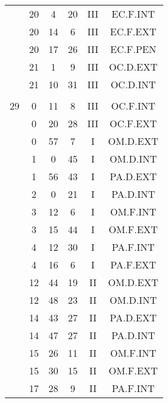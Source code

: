 \documentclass[12pt, a4paper]{article}
\begin{document}
\begin{multicols}{3}
{\begin{tabular}{c c c c c c}
	 	 	 	 & 20 & 4 & 20 & III & EC.F.INT\\%
	 	 	 	 & 20 & 14 & 6 & III & EC.F.EXT\\%
	 	 	 	 & 20 & 17 & 26 & III & EC.F.PEN\\%
	 	 	 	 & 21 & 1 & 9 & III & OC.D.EXT\\%
	 	 	 	 & 21 & 10 & 31 & III & OC.D.INT\\%
	 	 	 	 & & & & & \\%
	 	 	 	29 & 0 & 11 & 8 & III & OC.F.INT\\%
	 	 	 	 & 0 & 20 & 28 & III & OC.F.EXT\\%
	 	 	 	 & 0 & 57 & 7 & I & OM.D.EXT\\%
	 	 	 	 & 1 & 0 & 45 & I & OM.D.INT\\%
	 	 	 	 & 1 & 56 & 43 & I & PA.D.EXT\\%
	 	 	 	 & 2 & 0 & 21 & I & PA.D.INT\\%
	 	 	 	 & 3 & 12 & 6 & I & OM.F.INT\\%
	 	 	 	 & 3 & 15 & 44 & I & OM.F.EXT\\%
	 	 	 	 & 4 & 12 & 30 & I & PA.F.INT\\%
	 	 	 	 & 4 & 16 & 6 & I & PA.F.EXT\\%
	 	 	 	 & 12 & 44 & 19 & II & OM.D.EXT\\%
	 	 	 	 & 12 & 48 & 23 & II & OM.D.INT\\%
	 	 	 	 & 14 & 43 & 27 & II & PA.D.EXT\\%
	 	 	 	 & 14 & 47 & 27 & II & PA.D.INT\\%
	 	 	 	 & 15 & 26 & 11 & II & OM.F.INT\\%
	 	 	 	 & 15 & 30 & 15 & II & OM.F.EXT\\%
	 	 	 	 & 17 & 28 & 9 & II & PA.F.INT\\%

\end{tabular}}
\end{multicols}
\end{document}
